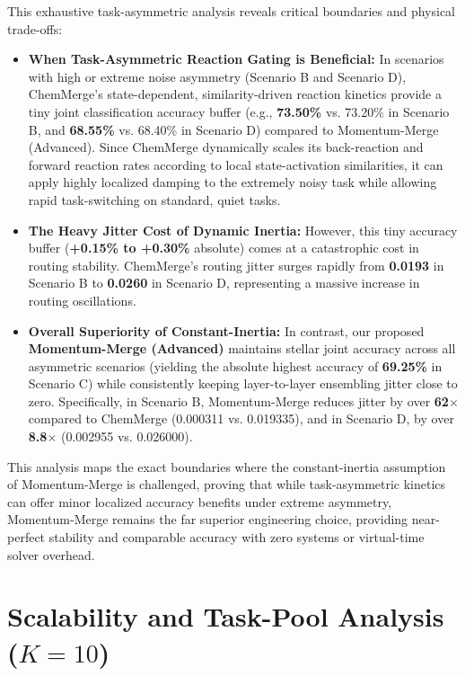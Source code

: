 \documentclass{article}
\theoremstyle{plain}
\theoremstyle{definition}
\theoremstyle{remark}
\begin{document}
    This exhaustive task-asymmetric analysis reveals critical boundaries and physical trade-offs:
    \begin{itemize}
        \item \textbf{When Task-Asymmetric Reaction Gating is Beneficial:} In scenarios with high or extreme noise asymmetry (Scenario B and Scenario D), ChemMerge's state-dependent, similarity-driven reaction kinetics provide a tiny joint classification accuracy buffer (e.g., \textbf{73.50\%} vs. 73.20\% in Scenario B, and \textbf{68.55\%} vs. 68.40\% in Scenario D) compared to Momentum-Merge (Advanced). Since ChemMerge dynamically scales its back-reaction and forward reaction rates according to local state-activation similarities, it can apply highly localized damping to the extremely noisy task while allowing rapid task-switching on standard, quiet tasks. 
        \item \textbf{The Heavy Jitter Cost of Dynamic Inertia:} However, this tiny accuracy buffer (\textbf{+0.15\% to +0.30\%} absolute) comes at a catastrophic cost in routing stability. ChemMerge's routing jitter surges rapidly from \textbf{0.0193} in Scenario B to \textbf{0.0260} in Scenario D, representing a massive increase in routing oscillations.
        \item \textbf{Overall Superiority of Constant-Inertia:} In contrast, our proposed \textbf{Momentum-Merge (Advanced)} maintains stellar joint accuracy across all asymmetric scenarios (yielding the absolute highest accuracy of \textbf{69.25\%} in Scenario C) while consistently keeping layer-to-layer ensembling jitter close to zero. Specifically, in Scenario B, Momentum-Merge reduces jitter by over \textbf{62$\times$} compared to ChemMerge (0.000311 vs. 0.019335), and in Scenario D, by over \textbf{8.8$\times$} (0.002955 vs. 0.026000). 
    \end{itemize}
    This analysis maps the exact boundaries where the constant-inertia assumption of Momentum-Merge is challenged, proving that while task-asymmetric kinetics can offer minor localized accuracy benefits under extreme asymmetry, Momentum-Merge remains the far superior engineering choice, providing near-perfect stability and comparable accuracy with zero systems or virtual-time solver overhead.

    \section{Scalability and Task-Pool Analysis ($K=10$)}
    \label{app:scale_analysis}
\end{document}
